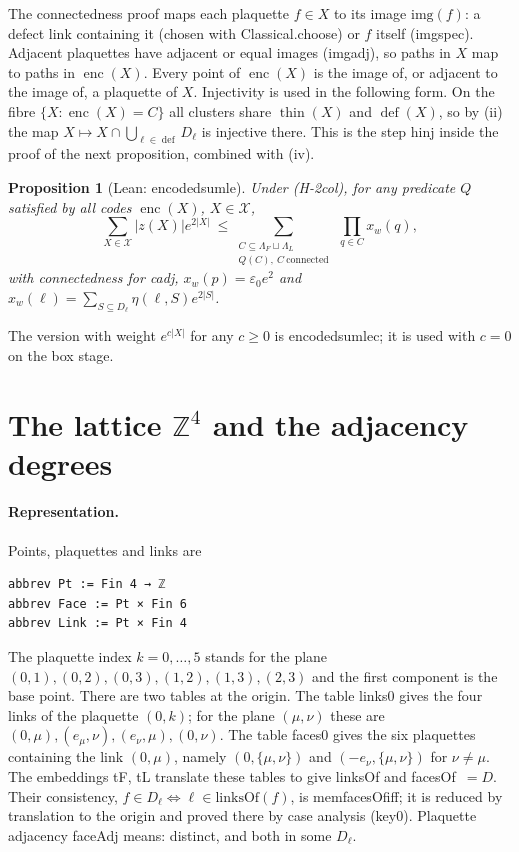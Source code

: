\documentclass[11pt,a4paper]{article}
\newtheorem{proposition}[theorem]{Proposition}
\theoremstyle{definition}
\theoremstyle{remark}
\DeclareRobustCommand{\lean}[1]{{\ttfamily\renewcommand{\_}{\textunderscore\allowbreak}#1}}
\newenvironment{leanquote}{\par\smallskip\footnotesize}{\par\smallskip}
\newcommand{\thin}{\operatorname{thin}}
\newcommand{\dfc}{\operatorname{def}}
\newcommand{\enc}{\operatorname{enc}}
\begin{document}
The connectedness proof maps each plaquette $f\in X$ to its image $\mathrm{img}(f)$: a defect link containing it (chosen with \lean{Classical.choose}) or $f$ itself (\lean{img\_spec}). Adjacent plaquettes have adjacent or equal images (\lean{img\_adj}), so paths in $X$ map to paths in $\enc(X)$. Every point of $\enc(X)$ is the image of, or adjacent to the image of, a plaquette of $X$. Injectivity is used in the following form. On the fibre $\{X:\enc(X)=C\}$ all clusters share $\thin(X)$ and $\dfc(X)$, so by (ii) the map $X\mapsto X\cap\bigcup_{\ell\in\dfc}D_\ell$ is injective there. This is the step \lean{hinj} inside the proof of the next proposition, combined with (iv).

\begin{proposition}[Lean: \lean{encoded\_sum\_le}]\label{prop:encsum}
Under (H-2col), for any predicate $Q$ satisfied by all codes $\enc(X)$, $X\in\mathcal X$,
\[
\sum_{X\in\mathcal X}|z(X)|e^{2|X|}\ \le \sum_{\substack{C\subseteq\Lambda_F\sqcup\Lambda_L\\ Q(C),\ C\ \text{connected}}}\ \prod_{q\in C}x_w(q),
\]
with connectedness for \lean{cadj}, $x_w(p)=\varepsilon_0e^2$ and $x_w(\ell)=\sum_{S\subseteq D_\ell}\eta(\ell,S)e^{2|S|}$.
\end{proposition}
The version with weight $e^{c|X|}$ for any $c\ge0$ is \lean{encoded\_sum\_le\_c}; it is used with $c=0$ on the box stage.

\section{The lattice \texorpdfstring{$\mathbb{Z}^4$}{Z4} and the adjacency degrees}\label{sec:lattice}

\paragraph{Representation.} Points, plaquettes and links are
\begin{leanquote}
\begin{verbatim}
abbrev Pt := Fin 4 → ℤ
abbrev Face := Pt × Fin 6
abbrev Link := Pt × Fin 4
\end{verbatim}
\end{leanquote}
The plaquette index $k=0,\dots,5$ stands for the plane $(0,1),(0,2),(0,3),(1,2),(1,3),(2,3)$ and the first component is the base point. There are two tables at the origin. The table \lean{links0} gives the four links of the plaquette $(0,k)$; for the plane $(\mu,\nu)$ these are $(0,\mu),(e_\mu,\nu),(e_\nu,\mu),(0,\nu)$. The table \lean{faces0} gives the six plaquettes containing the link $(0,\mu)$, namely $(0,\{\mu,\nu\})$ and $(-e_\nu,\{\mu,\nu\})$ for $\nu\neq\mu$. The embeddings \lean{tF}, \lean{tL} translate these tables to give \lean{linksOf} and \lean{facesOf}~$=D$. Their consistency, $f\in D_\ell\iff\ell\in\mathrm{linksOf}(f)$, is \lean{mem\_facesOf\_iff}; it is reduced by translation to the origin and proved there by case analysis (\lean{key0}). Plaquette adjacency \lean{faceAdj} means: distinct, and both in some $D_\ell$.
\end{document}
